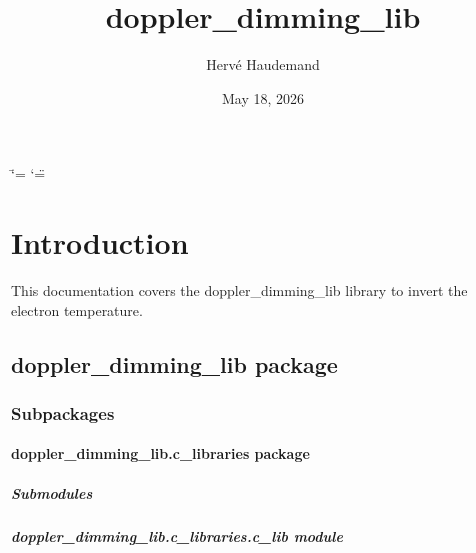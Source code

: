 \documentclass[letterpaper,10pt,english]{sphinxmanual}
\title{doppler\_dimming\_lib}
\date{May 18, 2026}
\author{Hervé Haudemand}
\begin{document}
\ifdefined\shorthandoff
  \ifnum\catcode`\=\string=\active\shorthandoff{=}\fi
  \ifnum\catcode`\"=\active{}\fi
\fi

\pagestyle{empty}
\sphinxmaketitle
\pagestyle{plain}
\sphinxtableofcontents
\pagestyle{normal}
\label{\detokenize{index::doc}}



\chapter{Introduction}
\label{\detokenize{index:introduction}}
\sphinxAtStartPar
This documentation covers the doppler\_dimming\_lib library to invert the electron temperature.

\sphinxstepscope


\section{doppler\_dimming\_lib package}
\label{\detokenize{doppler_dimming_lib:doppler-dimming-lib-package}}\label{\detokenize{doppler_dimming_lib::doc}}

\subsection{Subpackages}
\label{\detokenize{doppler_dimming_lib:subpackages}}
\sphinxstepscope


\subsubsection{doppler\_dimming\_lib.c\_libraries package}
\label{\detokenize{doppler_dimming_lib.c_libraries:doppler-dimming-lib-c-libraries-package}}\label{\detokenize{doppler_dimming_lib.c_libraries::doc}}

\paragraph{Submodules}
\label{\detokenize{doppler_dimming_lib.c_libraries:submodules}}

\paragraph{doppler\_dimming\_lib.c\_libraries.c\_lib module}
\label{\detokenize{doppler_dimming_lib.c_libraries:module-doppler_dimming_lib.c_libraries.c_lib}}\label{\detokenize{doppler_dimming_lib.c_libraries:doppler-dimming-lib-c-libraries-c-lib-module}}
\end{document}
